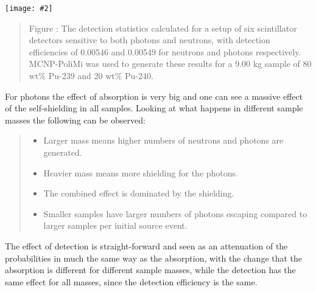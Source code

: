 \documentclass[landscape,a0,final,a4resizeable]{a0poster}
\newenvironment{poster}{
  \begin{center}
  \begin{minipage}[c]{0.98\textwidth}
}{
  \end{minipage}
  \end{center}
}
\newcommand{\pbox}[4]{
\psshadowbox[#3]{
\begin{minipage}[t][#2][t]{#1}
#4
\end{minipage}
}}
\newcommand{\myfig}[3][0]{
\begin{center}
  \vspace{1.5cm}
  \texttt{[image: \#2]}
  \nobreak\medskip
\end{center}}
\newcommand{\mycaption}[1]{
  \vspace{0.5cm}
  \begin{quote}
    {{\sc Figure} \arabic{figure}: #1}
  \end{quote}
  \vspace{1cm}
  \stepcounter{figure}
}
\begin{document}
\begin{poster}
\begin{multicols}{4}

\vspace{-1.5cm}
\begin{center}
  \myfig{MCgraph.eps}{0.9}
  \mycaption{The detection statistics calculated for a setup of
  six scintillator detectors sensitive to both photons and neutrons,
  with detection efficiencies of 0.00546 and 0.00549 for neutrons
  and photons respectively. MCNP-PoliMi was used to generate these
  results for a 9.00 kg sample of 80 wt\% Pu-239 and 20 wt\% Pu-240.}
\end{center}
\vspace{-0.5cm}

For photons the effect of absorption is very big and one can see a
massive effect of the self-shielding in all samples. Looking at
what happens in different sample masses the following can be
observed:
\begin{quote}
\begin{itemize}
    \item Larger mass means higher numbers of neutrons and photons are
    generated.

    \item Heavier mass means more shielding for the photons.

    \item The combined effect is dominated by the shielding.

    \item Smaller samples have larger numbers of photons escaping
compared to larger samples per initial source event.
\end{itemize}
\end{quote}
The effect of detection is straight-forward and seen as an
attenuation of the probabilities in much the same way as the
absorption, with the change that the absorption is different for
different sample masses, while the detection has the same effect
for all masses, since the detection efficiency is the same.


\end{multicols}
\end{poster}
\end{document}
